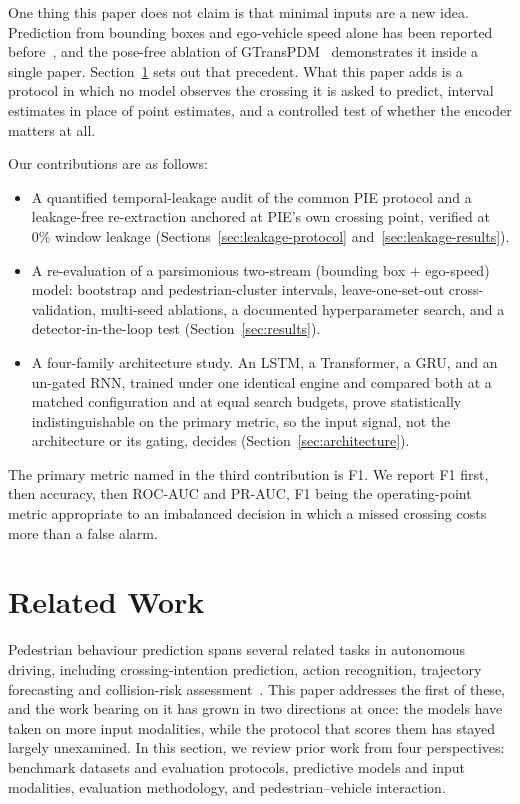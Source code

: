 \documentclass[mti,article,submit,moreauthors]{Definitions/mdpi}
\begin{document}
One thing this paper does not claim is that minimal inputs are a new idea. Prediction from bounding boxes and ego-vehicle speed alone has been reported before~\citep{chen2024pedcmt,achaji2022attention}, and the pose-free ablation of GTransPDM~\citep{xie2025gtranspdm} demonstrates it inside a single paper. Section~\ref{sec:related-work} sets out that precedent. What this paper adds is a protocol in which no model observes the crossing it is asked to predict, interval estimates in place of point estimates, and a controlled test of whether the encoder matters at all.

Our contributions are as follows:
\begin{itemize}
\item A quantified temporal-leakage audit of the common PIE protocol and a leakage-free re-extraction anchored at PIE's own crossing point, verified at 0\% window leakage (Sections~\ref{sec:leakage-protocol} and~\ref{sec:leakage-results}).
\item A re-evaluation of a parsimonious two-stream (bounding box $+$ ego-speed) model: bootstrap and pedestrian-cluster intervals, leave-one-set-out cross-validation, multi-seed ablations, a documented hyperparameter search, and a detector-in-the-loop test (Section~\ref{sec:results}).
\item A four-family architecture study. An LSTM, a Transformer, a GRU, and an un-gated RNN, trained under one identical engine and compared both at a matched configuration and at equal search budgets, prove statistically indistinguishable on the primary metric, so the input signal, not the architecture or its gating, decides (Section~\ref{sec:architecture}).
\end{itemize}

The primary metric named in the third contribution is F1. We report F1 first, then accuracy, then ROC-AUC and PR-AUC, F1 being the operating-point metric appropriate to an imbalanced decision in which a missed crossing costs more than a false alarm.

\section{Related Work}
\label{sec:related-work}

Pedestrian behaviour prediction spans several related tasks in autonomous driving, including crossing-intention prediction, action recognition, trajectory forecasting and collision-risk assessment~\citep{sharma2022survey,rasouli2024diving}. This paper addresses the first of these, and the work bearing on it has grown in two directions at once: the models have taken on more input modalities, while the protocol that scores them has stayed largely unexamined. In this section, we review prior work from four perspectives: benchmark datasets and evaluation protocols, predictive models and input modalities, evaluation methodology, and pedestrian--vehicle interaction.
\end{document}
